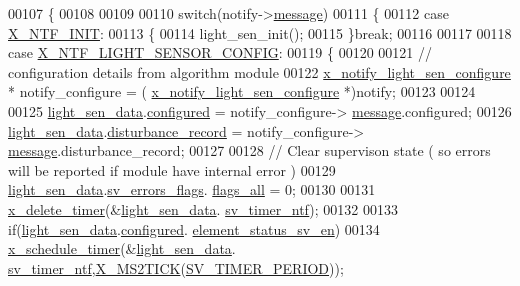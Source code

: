 \begin{DoxyCode}
00107 \{
00108 
00109     
00110     \textcolor{keywordflow}{switch}(notify->\hyperlink{a00036_adf9665938515a20c283eea2c978cf80d}{message})
00111     \{    
00112         \textcolor{keywordflow}{case} \hyperlink{a00036_a620b808f2d7b8d2a03c4d026a4c5423c}{X\_NTF\_INIT}:
00113         \{
00114             light\_sen\_init();
00115         \}\textcolor{keywordflow}{break};
00116 
00117 
00118         \textcolor{keywordflow}{case} \hyperlink{a00018_ac8c3accc8173c965137b300542e451e6}{X\_NTF\_LIGHT\_SENSOR\_CONFIG}:
00119         \{
00120 
00121             \textcolor{comment}{// configuration details from algorithm module}
00122             \hyperlink{a00018_da/de3/a00856}{x\_notify\_light\_sen\_configure} * notify\_configure = (
      \hyperlink{a00018_da/de3/a00856}{x\_notify\_light\_sen\_configure} *)notify;
00123 
00124            
00125             \hyperlink{a00047_a53c98c9f84d5cecf0747bbe1f6b83696}{light\_sen\_data}.\hyperlink{a00024_a94b2d1f6ea4ab334c74d24984dd27843}{configured} = notify\_configure->
      \hyperlink{a00018_a32952acc732e2f16aad59fe0804da5bf}{message}.configured;
00126             \hyperlink{a00047_a53c98c9f84d5cecf0747bbe1f6b83696}{light\_sen\_data}.\hyperlink{a00024_ac9b38e2c1d3f1013a88d33506c754152}{disturbance\_record} = notify\_configure->
      \hyperlink{a00018_a32952acc732e2f16aad59fe0804da5bf}{message}.disturbance\_record;
00127 
00128             \textcolor{comment}{// Clear supervison state ( so errors will be reported if module have internal error )}
00129              \hyperlink{a00047_a53c98c9f84d5cecf0747bbe1f6b83696}{light\_sen\_data}.\hyperlink{a00024_aaeec6b0609dba31393f337abf1cce3d3}{sv\_errors\_flags}.
      \hyperlink{a00022_a1caa87b00c878186140c3bac9c8acf3b}{flags\_all} = 0;
00130 
00131           \hyperlink{a00036_ab69e9af4cfa717e870d587906283635c}{x\_delete\_timer}(&\hyperlink{a00047_a53c98c9f84d5cecf0747bbe1f6b83696}{light\_sen\_data}.
      \hyperlink{a00024_ada91b200053f2d93e3639dc4ee3415b4}{sv\_timer\_ntf});
00132 
00133           \textcolor{keywordflow}{if}(\hyperlink{a00047_a53c98c9f84d5cecf0747bbe1f6b83696}{light\_sen\_data}.\hyperlink{a00024_a94b2d1f6ea4ab334c74d24984dd27843}{configured}.
      \hyperlink{a00021_afeb3f74725269028a60926f98890c22b}{element\_status\_sv\_en})
00134           \hyperlink{a00036_a9e3befaa21e83f196f74201deed85346}{x\_schedule\_timer}(&\hyperlink{a00047_a53c98c9f84d5cecf0747bbe1f6b83696}{light\_sen\_data}.
      \hyperlink{a00024_ada91b200053f2d93e3639dc4ee3415b4}{sv\_timer\_ntf},\hyperlink{a00036_a1732cd929c486b3a225824bb2b3dba36}{X\_MS2TICK}(\hyperlink{a00023_a8a535456285f4602701c814d7b69cc68}{SV\_TIMER\_PERIOD}));

\end{DoxyCode}
